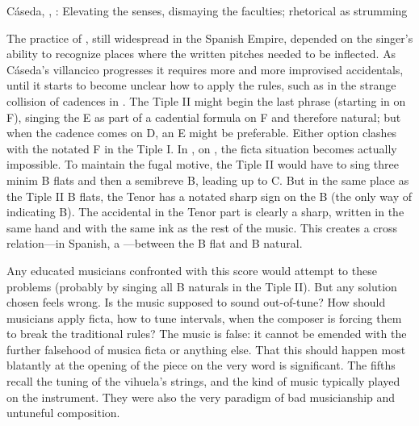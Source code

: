 {Cáseda, , : Elevating the senses,
dismaying the faculties; rhetorical  as strumming}

The practice of , still widespread in the Spanish Empire,
depended on the singer's ability to recognize places where the written pitches
needed to be inflected.%
   \Autocite{Berger:Ficta} 
As Cáseda's villancico progresses it requires more and more improvised
accidentals, until it starts to become unclear how to apply the rules, such as
in the strange collision of cadences in .
The Tiple II might begin the last phrase (starting in  on F),
singing the E as part of a cadential formula on F and therefore natural; but
when the cadence comes on D, an E\fl{} might be preferable. 
Either option clashes with the notated F\sh{} in the Tiple I.
In , on , the ficta situation becomes
actually impossible.
To maintain the fugal motive, the Tiple II would have to sing three minim B
flats and then a semibreve B\na, leading up to C.
But in the same place as the Tiple II B flats, the Tenor has a notated sharp
sign on the B (the only way of indicating B\na).
The accidental in the Tenor part is clearly a sharp, written in the same hand
and with the same ink as the rest of the music.
This creates a cross relation---in Spanish, a ---between
the B flat and B natural.

Any educated musicians confronted with this score would attempt to 
these problems (probably by singing all B naturals in the Tiple II).
But any solution chosen feels wrong.
Is the music supposed to sound out-of-tune?
How should musicians apply ficta, how to tune intervals, when the composer is
forcing them to break the traditional rules?
The music is false: it cannot be emended with the further falsehood of musica
ficta or anything else.
That this should happen most blatantly at the opening of the piece on the very
word  is significant.
The fifths recall the tuning of the vihuela's strings, and the kind of music
typically played on the instrument. 
They were also the very paradigm of bad musicianship and untuneful composition.

